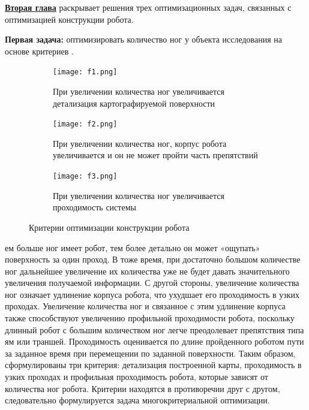 
\textbf{\underline{Вторая глава}} раскрывает решения трех оптимизационных задач, связанных с оптимизацией конструкции робота.

\textbf{Первая задача:} оптимизировать количество ног у объекта исследования на основе критериев . 

\begin{figure}[H]
    \begin{subfigure}{0.49\textwidth}
        \centering\texttt{[image: f1.png]}
        \caption{При увеличении количества ног увеличивается детализация картографируемой поверхности}
        \label{fig:f1.png}
    \end{subfigure}
    \begin{subfigure}{0.49\textwidth}
        \centering\texttt{[image: f2.png]}
        \caption{При увеличении количества ног, корпус робота увеличивается и он не может пройти часть препятствий}
        \label{fig:f2.png}
    \end{subfigure}

    \hfill
    \begin{subfigure}{\textwidth}
        \centering\texttt{[image: f3.png]}
        \caption{При увеличении количества ног увеличивается проходимость системы}
        \label{fig:f3.png}
    \end{subfigure}
    \hfill

\caption{Критерии оптимизации конструкции робота}
\label{fig:opti_criteria}
\end{figure}

ем больше ног имеет робот, тем более детально он может «ощупать» поверхность за один проход. В тоже время, при достаточно большом количестве ног дальнейшее увеличение их количества уже не будет давать значительного увеличения получаемой информации. С другой стороны, увеличение количества ног означает удлинение корпуса робота, что ухудшает его проходимость в узких проходах. Увеличение количества ног и связанное с этим удлинение корпуса также способствуют увеличению профильной проходимости робота, поскольку длинный робот с большим количеством ног легче преодолевает препятствия типа ям или траншей. Проходимость оценивается по длине пройденного роботом пути за заданное время при перемещении по заданной поверхности. Таким образом, сформулированы три критерия: детализация построенной карты, проходимость в узких проходах и профильная проходимость робота, которые зависят от количества ног робота. Критерии находятся в противоречии друг с другом, следовательно формулируется задача многокритериальной оптимизации. 

